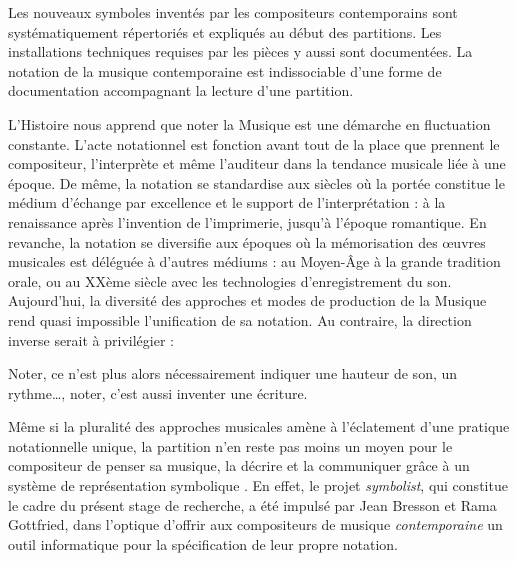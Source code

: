 Les nouveaux symboles inventés par les compositeurs contemporains sont systématiquement répertoriés et expliqués au début des partitions. Les installations techniques requises par les pièces y aussi sont documentées. La notation de la musique contemporaine est indissociable d'une forme de documentation accompagnant la lecture d'une partition.

\bigskip

L'Histoire nous apprend que noter la Musique est une démarche en fluctuation constante. L'acte notationnel est fonction avant tout de la place que prennent le compositeur, l'interprète et même l'auditeur dans la tendance musicale liée à une époque.
De même, la notation se standardise aux siècles où la portée constitue le médium d'échange par excellence et le support de l'interprétation : à la renaissance après l'invention de l'imprimerie, jusqu'à l'époque romantique.
En revanche, la notation se diversifie aux époques où la mémorisation des œuvres musicales est déléguée à d'autres médiums : au Moyen-Âge à la grande tradition orale, ou au XXème siècle avec les technologies d'enregistrement du son.
Aujourd'hui, la diversité des approches et modes de production de la Musique rend quasi impossible l'unification de sa notation.
Au contraire, la direction inverse serait à privilégier :
\begin{displayquote}
\og Noter, ce n'est plus alors nécessairement indiquer une hauteur de son, un rythme…, noter, c'est aussi inventer une écriture.\fg 
\end{displayquote}
Même si la pluralité des approches musicales amène à l'éclatement d'une pratique notationnelle unique, la partition n'en reste pas moins \og un moyen pour le compositeur de penser sa musique, la décrire et la communiquer grâce à un système de représentation symbolique \fg \cite{bresson2008}.
En effet, le projet \textit{symbolist}, qui constitue le cadre du présent stage de recherche, a été impulsé par Jean Bresson et Rama Gottfried, dans l'optique d'offrir aux compositeurs de musique \textit{contemporaine} un outil informatique pour la spécification de leur propre notation.